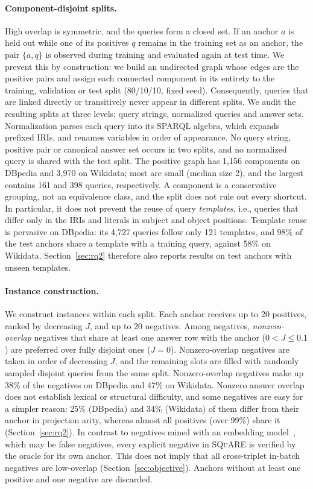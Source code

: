 \documentclass[runningheads]{llncs}
\newcommand{\squareds}{\textsc{SQuARE}}
\begin{document}
\paragraph{Component-disjoint splits.}
High overlap is symmetric, and the queries form a closed set. If an
anchor $a$ is held out while one of its positives $q$ remains in the training
set as an anchor, the pair $\{a,q\}$ is observed during training and evaluated
again at test time. We prevent this by construction: we build an undirected
graph whose edges are the positive pairs and assign each connected component
in its entirety to the training, validation or test split (80/10/10, fixed
seed). Consequently, queries that are linked directly or transitively never
appear in different splits. We audit the resulting splits at three levels: query strings, normalized
queries and answer sets. Normalization parses each query into its SPARQL
algebra, which expands prefixed IRIs, and renames variables in order of
appearance. No query string, positive pair or canonical answer set occurs in
two splits, and no normalized query is shared with the test split. The positive graph has 1{,}156 components on
DBpedia and 3{,}970 on Wikidata; most are small (median size 2), and the
largest contains 161 and 398 queries, respectively.
A component is a conservative grouping, not an equivalence class, and the
split does not rule out every shortcut. In particular, it does not prevent
the reuse of query \emph{templates}, i.e., queries that differ only in the
IRIs and literals in subject and object positions. Template reuse is
pervasive on DBpedia: its 4{,}727 queries follow only 121 templates, and 98\%
of the test anchors share a template with a training query, against 58\% on
Wikidata. Section~\ref{sec:rq2} therefore also reports results on test
anchors with unseen templates.

\paragraph{Instance construction.}
We construct instances within each split. Each anchor receives up to 20
positives, ranked by decreasing $J$, and up to 20 negatives. Among negatives,
\emph{nonzero-overlap} negatives that share at least one answer row with the
anchor ($0 < J \leq 0.1$) are preferred over fully disjoint ones ($J = 0$).
Nonzero-overlap negatives are taken in order of decreasing $J$, and the
remaining slots are filled with randomly sampled disjoint queries from the
same split. Nonzero-overlap negatives make up 38\% of the negatives on DBpedia
and 47\% on Wikidata. Nonzero answer overlap does not establish lexical or
structural difficulty, and some negatives are easy for a simpler reason: 25\%
(DBpedia) and 34\% (Wikidata) of them differ from their anchor in projection
arity, whereas almost all positives (over 99\%) share it
(Section~\ref{sec:rq2}). In contrast to negatives mined
with an embedding model~\cite{xiong2021ance}, which may be false negatives,
every explicit negative in \squareds{} is verified by the oracle for its
own anchor. This does not imply that all cross-triplet in-batch negatives are
low-overlap (Section~\ref{sec:objective}). Anchors without at
least one positive and one negative are discarded.
\end{document}

